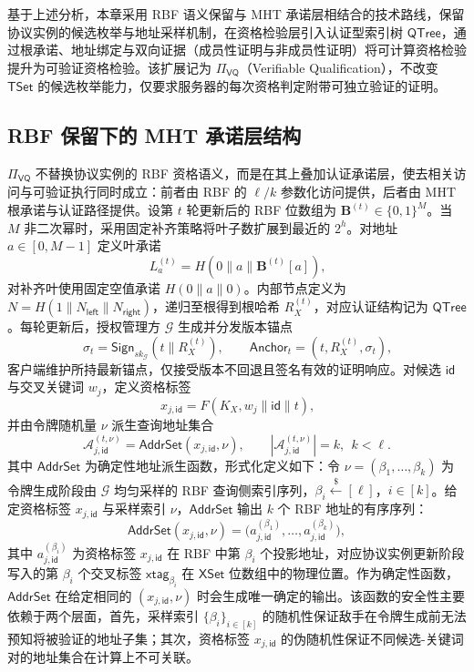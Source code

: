 基于上述分析，本章采用 RBF 语义保留与 MHT 承诺层相结合的技术路线，保留协议实例的候选枚举与地址采样机制，在资格检验层引入认证型索引树 $\mathsf{QTree}$，通过根承诺、地址绑定与双向证据（成员性证明与非成员性证明）将可计算资格检验提升为可验证资格检验。该扩展记为 $\Pi_{\mathsf{VQ}}$（Verifiable Qualification），不改变 $\mathsf{TSet}$ 的候选枚举能力，仅要求服务器的每次资格判定附带可独立验证的证明。

\subsection{RBF 保留下的 MHT 承诺层结构}
$\Pi_{\mathsf{VQ}}$ 不替换协议实例的 RBF 资格语义，而是在其上叠加认证承诺层，使去相关访问与可验证执行同时成立：前者由 RBF 的 $\ell/k$ 参数化访问提供，后者由 MHT 根承诺与认证路径提供。设第 $t$ 轮更新后的 RBF 位数组为 $\mathbf{B}^{(t)}\in\{0,1\}^{M}$。当 $M$ 非二次幂时，采用固定补齐策略将叶子数扩展到最近的 $2^h$。对地址 $a\in[0,M-1]$ 定义叶承诺
\begin{equation}
L_a^{(t)}=H(0\|a\|\mathbf{B}^{(t)}[a])\text{,}
\end{equation}
对补齐叶使用固定空值承诺 $H(0\|a\|0)$。内部节点定义为 $N=H(1\|N_{\mathsf{left}}\|N_{\mathsf{right}})$，递归至根得到根哈希 $R_X^{(t)}$，对应认证结构记为 $\mathsf{QTree}$。每轮更新后，授权管理方 $\mathcal{G}$ 生成并分发版本锚点
\begin{equation}
\sigma_t=\mathsf{Sign}_{sk_{\mathcal{G}}}(t\|R_X^{(t)}),\qquad \mathsf{Anchor}_t=(t,R_X^{(t)},\sigma_t)\text{,}
\end{equation}
客户端维护所持最新锚点，仅接受版本不回退且签名有效的证明响应。对候选 $\mathsf{id}$ 与交叉关键词 $w_j$，定义资格标签
\begin{equation}
x_{j,\mathsf{id}}=F(K_X,w_j\|\mathsf{id}\|t)\text{,}\label{eq:xtag-abstract}
\end{equation}
并由令牌随机量 $\nu$ 派生查询地址集合
\begin{equation}
\mathcal{A}_{j,\mathsf{id}}^{(t,\nu)}=\mathsf{AddrSet}(x_{j,\mathsf{id}},\nu),\qquad |\mathcal{A}_{j,\mathsf{id}}^{(t,\nu)}|=k,\ \ k<\ell\text{.}\label{eq:addrset-def}
\end{equation}
其中 $\mathsf{AddrSet}$ 为确定性地址派生函数，形式化定义如下：令 $\nu=(\beta_1,\ldots,\beta_k)$ 为令牌生成阶段由 $\mathcal{G}$ 均匀采样的 RBF 查询侧索引序列，$\beta_i\xleftarrow{\$}[\ell]$，$i\in[k]$。给定资格标签 $x_{j,\mathsf{id}}$ 与采样索引 $\nu$，$\mathsf{AddrSet}$ 输出 $k$ 个 RBF 地址的有序序列：
\begin{equation}
\mathsf{AddrSet}(x_{j,\mathsf{id}},\nu)=\big(a_{j,\mathsf{id}}^{(\beta_1)},\ldots,a_{j,\mathsf{id}}^{(\beta_k)}\big),\label{eq:addrset-expand}
\end{equation}
其中 $a_{j,\mathsf{id}}^{(\beta_i)}$ 为资格标签 $x_{j,\mathsf{id}}$ 在 RBF 中第 $\beta_i$ 个投影地址，对应协议实例更新阶段写入的第 $\beta_i$ 个交叉标签 $\mathsf{xtag}_{\beta_i}$ 在 $\mathsf{XSet}$ 位数组中的物理位置。作为确定性函数，$\mathsf{AddrSet}$ 在给定相同的 $(x_{j,\mathsf{id}},\nu)$ 时会生成唯一确定的输出。该函数的安全性主要依赖于两个层面，首先，采样索引 $\{\beta_i\}_{i\in[k]}$ 的随机性保证敌手在令牌生成前无法预知将被验证的地址子集；其次，资格标签 $x_{j,\mathsf{id}}$ 的伪随机性保证不同候选-关键词对的地址集合在计算上不可关联。


